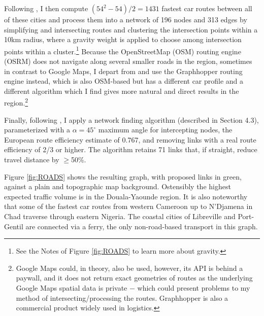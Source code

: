\documentclass[a4paper]{article}
\begin{document}
Following \citet{krantz2024optimal}, I then compute $(54^2-54)/2 = 1431$ fastest car routes between all of these cities and process them into a network of 196 nodes and 313 edges by simplifying and intersecting routes and clustering the intersection points within a 10km radius, where a gravity weight is applied to choose among intersection points within a cluster.\footnote{See the Notes of Figure \ref{fig:ROADS} to learn more about gravity.} Because the OpenStreetMap (OSM) routing engine (OSRM) does not navigate along several smaller roads in the region, sometimes in contrast to Google Maps, I depart from \citet{krantz2024optimal} and use the Graphhopper routing engine instead, which is also OSM-based but has a different car profile and a different algorithm which I find gives more natural and direct results in the region.\footnote{Google Maps could, in theory, also be used, however, its API is behind a paywall, and it does not return exact geometries of routes as the underlying Google Maps spatial data is private $-$ which could present problems to my method of intersecting/processing the routes. Graphhopper is also a commercial product widely used in logistics.}  \newline 

Finally, following \citet{krantz2024optimal}, I apply a network finding algorithm (described in \citet{krantz2024optimal} Section 4.3), parameterized with a $\alpha = 45^\circ$ maximum angle for intercepting nodes, the European route efficiency estimate of 0.767, and removing links with a real route efficiency of 2/3 or higher. The algorithm retains 71 links that, if straight, reduce travel distance by $\geq$50\%. \newline

Figure \ref{fig:ROADS} shows the resulting graph, with proposed links in green, against a plain and topographic map background. Ostensibly the highest expected traffic volume is in the Douala-Yaounde region. It is also noteworthy that some of the fastest car routes from western Cameroon up to N'Djamena in Chad traverse through eastern Nigeria. The coastal cities of Libreville and Port-Gentil are connected via a ferry, the only non-road-based transport in this graph.  %
\end{document}
